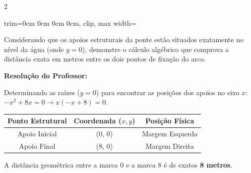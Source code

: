 \begin{multicols*}{2}
\begin{center}
\begin{adjustbox}{trim=0cm 0cm 0cm 0cm, clip, max width=\larguraTikz}
\end{adjustbox}
\end{center}

Considerando que os apoios estruturais da ponte estão situados exatamente no nível da água (onde $ y = 0 $), demonstre o cálculo algébrico que comprova a distância exata em metros entre os dois pontos de fixação do arco.

\ifgabarito
    \begin{tcolorbox}[colback=CorTitUm!5, colframe=CorTitUm, boxrule=1pt, arc=4pt, left=6pt, right=6pt, top=6pt, bottom=6pt]
    \small\textbf{\textcolor{CorTitUm}{Resolução do Professor:}}\par\vspace{0.1cm}
    \color{CinzaEscuro}
    Determinando as raízes ($y = 0$) para encontrar as posições dos apoios no eixo $x$:
    $-x^2 + 8x = 0 \rightarrow x(-x + 8) = 0$.
    \vspace{0.1cm}
    \begin{center}
    \begin{tabular}{|c|c|c|}
    \hline
    \textbf{Ponto Estrutural} & \textbf{Coordenada ($x, y$)} & \textbf{Posição Física} \\
    \hline
    Apoio Inicial & (0, 0) & Margem Esquerda \\
    \hline
    Apoio Final & (8, 0) & Margem Direita \\
    \hline
    \end{tabular}
    \end{center}
    \vspace{0.1cm}
    A distância geométrica entre a marca 0 e a marca 8 é de exatos \textbf{8 metros}.
    \end{tcolorbox}
\fi


\end{multicols*}

